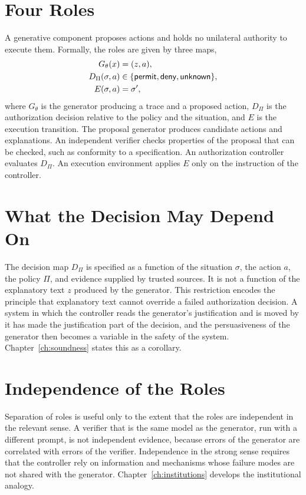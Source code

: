 \section{Four Roles}

A generative component proposes actions and holds no unilateral authority to execute them. Formally, the roles are given by three maps,
\begin{align*}
G_\theta(x)&=(z,a),\\
D_\Pi(\sigma,a)&\in\{\mathsf{permit},\mathsf{deny},\mathsf{unknown}\},\\
E(\sigma,a)&=\sigma',
\end{align*}
where $G_\theta$ is the generator producing a trace and a proposed action, $D_\Pi$ is the authorization decision relative to the policy and the situation, and $E$ is the execution transition. The proposal generator produces candidate actions and explanations. An independent verifier checks properties of the proposal that can be checked, such as conformity to a specification. An authorization controller evaluates $D_\Pi$. An execution environment applies $E$ only on the instruction of the controller.

\section{What the Decision May Depend On}

The decision map $D_\Pi$ is specified as a function of the situation $\sigma$, the action $a$, the policy $\Pi$, and evidence supplied by trusted sources. It is not a function of the explanatory text $z$ produced by the generator. This restriction encodes the principle that explanatory text cannot override a failed authorization decision. A system in which the controller reads the generator's justification and is moved by it has made the justification part of the decision, and the persuasiveness of the generator then becomes a variable in the safety of the system. Chapter~\ref{ch:soundness} states this as a corollary.

\section{Independence of the Roles}

Separation of roles is useful only to the extent that the roles are independent in the relevant sense. A verifier that is the same model as the generator, run with a different prompt, is not independent evidence, because errors of the generator are correlated with errors of the verifier. Independence in the strong sense requires that the controller rely on information and mechanisms whose failure modes are not shared with the generator. Chapter~\ref{ch:institutions} develops the institutional analogy.

